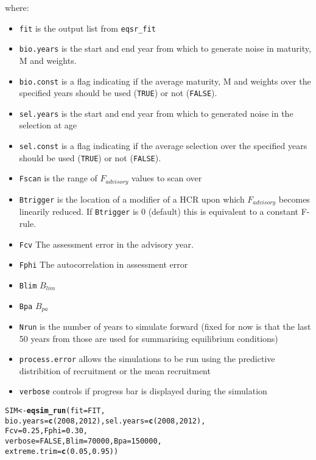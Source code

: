 \documentclass[a4paper]{article}\usepackage{graphicx, color}
\makeatletter
\newcommand{\hlfunctioncall}[1]{\textcolor[rgb]{0.501960784313725,0,0.329411764705882}{\textbf{#1}}}%
\newenvironment{kframe}{%
 \def\at@end@of@kframe{}%
 \ifinner\ifhmode%
  \def\at@end@of@kframe{\end{minipage}}%
  \begin{minipage}{\columnwidth}%
 \fi\fi%
 \def\FrameCommand##1{\hskip\@totalleftmargin \hskip-\fboxsep
 \colorbox{shadecolor}{##1}\hskip-\fboxsep
     \hskip-\linewidth \hskip-\@totalleftmargin \hskip\columnwidth}%
 \MakeFramed {\advance\hsize-\width
   \@totalleftmargin\z@ \linewidth\hsize
   \@setminipage}}%
 {\par\unskip\endMakeFramed%
 \at@end@of@kframe}
\newenvironment{knitrout}{}{} %
\makeatother
\begin{document}
where:
\begin{itemize}
  \item \texttt{fit} is the output list from \texttt{eqsr\_fit}
  \item \texttt{bio.years} is the start and end year from which to generate noise in maturity, M and weights. 
  \item \texttt{bio.const} is a flag indicating if the average maturity, M and weights over the specified years should be used (\texttt{TRUE}) or not (\texttt{FALSE}).
  \item \texttt{sel.years} is the start and end year from which to generated noise in the selection at age
  \item \texttt{sel.const} is a flag indicating if the average selection over the specified years should be used (\texttt{TRUE}) or not (\texttt{FALSE}).
  \item \texttt{Fscan} is the range of $F_{advisory}$ values to scan over
  \item \texttt{Btrigger} is the location of a modifier of a HCR upon which $F_{advisory}$ becomes linearily reduced. If \texttt{Btrigger} is 0 (default) this is equivalent to a constant F-rule.
  \item \texttt{Fcv} The assessment error in the advisory year.
  \item \texttt{Fphi} The autocorrelation in assessment error
  \item \texttt{Blim} $B_{lim}$
  \item \texttt{Bpa}  $B_{pa}$
  \item \texttt{Nrun} is the number of years to simulate forward (fixed for now is that the last 50 years from those are used for summarising equilibrium conditions)
  \item \texttt{process.error} allows the simulations to be run using the predictive distribition of recruitment or the mean recruitment
  \item \texttt{verbose} controls if progress bar is displayed during the simulation
\end{itemize}


\begin{knitrout}
\color{fgcolor}\begin{kframe}
\begin{alltt}
SIM <- \hlfunctioncall{eqsim_run}(fit=FIT,
                 bio.years=\hlfunctioncall{c}(2008,2012), sel.years=\hlfunctioncall{c}(2008,2012),
                 Fcv=0.25, Fphi=0.30,
                 verbose=FALSE, Blim=70000, Bpa=150000,
                 extreme.trim=\hlfunctioncall{c}(0.05,0.95))
\end{alltt}
\end{kframe}
\end{knitrout}
\end{document}
